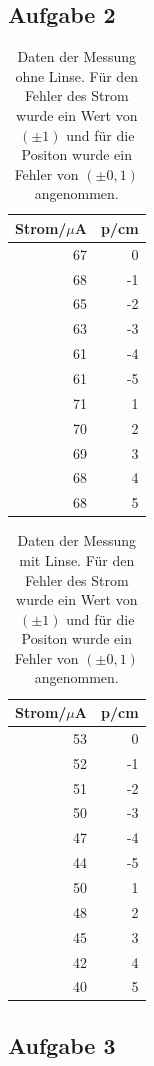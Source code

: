 \documentclass[12pt]{scrartcl}
\begin{document}
\subsection{Aufgabe 2}
\begin{table}[H]
\caption{Daten der Messung ohne Linse. Für den Fehler des Strom wurde ein Wert von $(\pm 1)$ und für die Positon wurde ein Fehler von $(\pm 0,1)$ angenommen.}
\begin{tabular}{|r|r|}
\hline
\multicolumn{1}{|l|}{Strom/$\mu$A} & \multicolumn{1}{l|}{p/cm} \\ \hline
67 & 0 \\ \hline
68 & -1 \\ \hline
65 & -2 \\ \hline
63 & -3 \\ \hline
61 & -4 \\ \hline
61 & -5 \\ \hline
71 & 1 \\ \hline
70 & 2 \\ \hline
69 & 3 \\ \hline
68 & 4 \\ \hline
68 & 5 \\ \hline
\end{tabular}
\label{tab:a_2_o}
\end{table}

\begin{table}[H]
\caption{Daten der Messung mit Linse. Für den Fehler des Strom wurde ein Wert von $(\pm 1)$ und für die Positon wurde ein Fehler von $(\pm 0,1)$ angenommen.}
\begin{tabular}{|r|r|}
\hline
\multicolumn{1}{|l|}{Strom/$\mu$A} & \multicolumn{1}{l|}{p/cm} \\ \hline
53 & 0 \\ \hline
52 & -1 \\ \hline
51 & -2 \\ \hline
50 & -3 \\ \hline
47 & -4 \\ \hline
44 & -5 \\ \hline
50 & 1 \\ \hline
48 & 2 \\ \hline
45 & 3 \\ \hline
42 & 4 \\ \hline
40 & 5 \\ \hline
\end{tabular}
\label{tab:a_2_m}
\end{table}

\subsection{Aufgabe 3}
\end{document}
